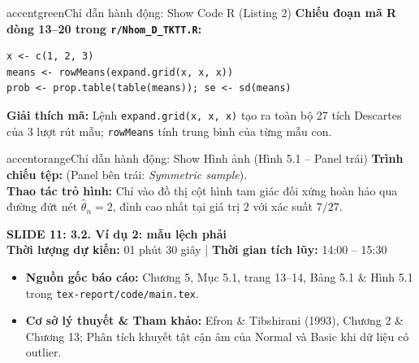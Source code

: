 \documentclass[10pt,a4paper]{article}
\newcommand{\slideheader}[4]{
    \vspace{0.4cm}
    \begin{tcolorbox}[colback=primary!7!white, colframe=primary, arc=2mm, boxrule=1pt, left=4mm, right=4mm, top=2.5mm, bottom=2.5mm]
        {\Large\bfseries\color{primary} SLIDE #1: #2}\\[0.1cm]
        {\small\textbf{Thời lượng dự kiến:} #3 \quad | \quad \textbf{Thời gian tích lũy:} #4}
    \end{tcolorbox}
    \vspace{0.15cm}
}
\begin{document}
\begin{actionbox}{accentgreen}{Chỉ dẫn hành động: Show Code R (Listing 2)}
    \textbf{Chiếu đoạn mã R dòng 13--20 trong \texttt{r/Nhom\_D\_TKTT.R}:}
\begin{verbatim}
x <- c(1, 2, 3)
means <- rowMeans(expand.grid(x, x, x))
prob <- prop.table(table(means)); se <- sd(means)
\end{verbatim}
    \textbf{Giải thích mã:} Lệnh \texttt{expand.grid(x, x, x)} tạo ra toàn bộ 27 tích Descartes của 3 lượt rút mẫu; \texttt{rowMeans} tính trung bình của từng mẫu con.
\end{actionbox}

\begin{actionbox}{accentorange}{Chỉ dẫn hành động: Show Hình ảnh (Hình 5.1 -- Panel trái)}
    \textbf{Trình chiếu tệp:}  (Panel bên trái: \textit{Symmetric sample}).\\
    \textbf{Thao tác trỏ hình:} Chỉ vào đồ thị cột hình tam giác đối xứng hoàn hảo qua đường đứt nét $\hat\theta_n = 2$, đỉnh cao nhất tại giá trị $2$ với xác suất $7/27$.
\end{actionbox}

\slideheader{11}{3.2. Ví dụ 2: mẫu lệch phải}{01 phút 30 giây}{14:00 -- 15:30}

\begin{itemize}
    \item \textbf{Nguồn gốc báo cáo:} Chương 5, Mục 5.1, trang 13--14, Bảng 5.1 \& Hình 5.1 trong \texttt{tex-report/code/main.tex}.
    \item \textbf{Cơ sở lý thuyết \& Tham khảo:} Efron \& Tibshirani (1993), Chương 2 \& Chương 13; Phân tích khuyết tật cận âm của Normal và Basic khi dữ liệu có outlier.
\end{itemize}
\end{document}
